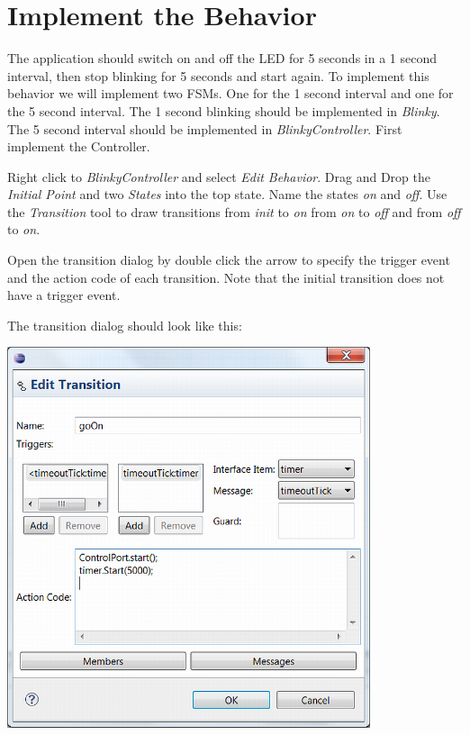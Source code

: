 \section{Implement the Behavior}

The application should switch on and off the LED for 5 seconds in a 1 second interval, then stop blinking 
for 5 seconds and start again. To implement this behavior we will implement two FSMs. One for the 1 second 
interval and one for the 5 second interval. The 1 second blinking should be implemented in 
\textit{Blinky}. The 5 second interval should be implemented in \textit{BlinkyController}. First implement 
the Controller.

Right click to \textit{BlinkyController} and select \textit{Edit Behavior}.
Drag and Drop the \textit{Initial Point} and two \textit{States} into the top state. Name the states 
\textit{on} and \textit{off}. 
Use the \textit{Transition} tool to draw transitions from \textit{init} to \textit{on} from \textit{on} to 
\textit{off} and from \textit{off} to \textit{on}.

Open the transition dialog by double click the arrow to specify the trigger event and the action code of 
each transition. Note that the initial transition does not have a trigger event.

The transition dialog should look like this:

\includegraphics[width=0.8\textwidth]{images/020-Blinky09.png}

